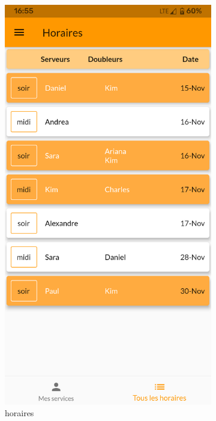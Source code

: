 \begin{figure}[!h]
\begin{subfigure}{.3\textwidth}
        \includegraphics[width=0.9\linewidth]{screenshots/scenario_01/horaires.png}
        \caption{horaires}
        \label{fig:horaires}
    \end{subfigure}
    \begin{subfigure}{.3\textwidth}
        \centering

\end{subfigure}
\end{figure}
